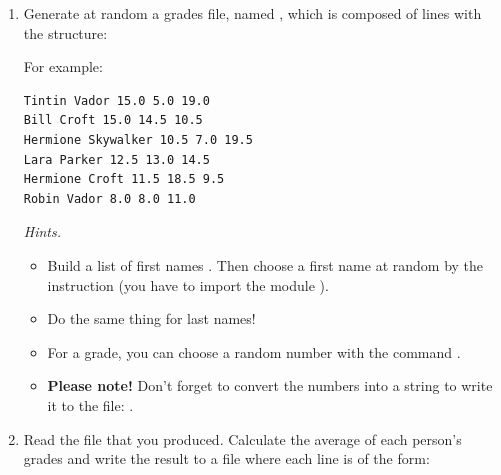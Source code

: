 \documentclass[11pt,class=report,crop=false]{standalone}
\begin{document}
\begin{activite}


\begin{enumerate}
  \item Generate at random a grades file, named , which is composed of lines with the structure: 
  
  For example:
\begin{center}
\begin{minipage}{0.5\textwidth}
\begin{lstlisting}
Tintin Vador 15.0 5.0 19.0
Bill Croft 15.0 14.5 10.5
Hermione Skywalker 10.5 7.0 19.5
Lara Parker 12.5 13.0 14.5
Hermione Croft 11.5 18.5 9.5
Robin Vador 8.0 8.0 11.0
\end{lstlisting}
\end{minipage}
\end{center}  
  

  \emph{Hints.}
  \begin{itemize}
    	\item Build a list of first names . Then choose a first name at random by the instruction  (you have to import the module ).
    	
    	\item Do the same thing for last names! 
    	
    	\item For a grade, you can choose a random number with the command . 
    	
    	\item \textbf{Please note!} Don't forget to convert the numbers into a string to write it to the file: .
    	
   \end{itemize}
    
  
  \item Read the file  that you produced. Calculate the average of each person's grades and write the result to a file  where each line is of the form:   
 

\end{enumerate}
\end{activite}
\end{document}
